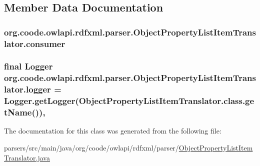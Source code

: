\subsection{Member Data Documentation}
\hypertarget{classorg_1_1coode_1_1owlapi_1_1rdfxml_1_1parser_1_1_object_property_list_item_translator_ab47844593c9a744bfc455132597d866f}{
\subsubsection[{consumer}]{ org.\-coode.\-owlapi.\-rdfxml.\-parser.\-Object\-Property\-List\-Item\-Translator.\-consumer\hspace{0.3cm}{\ttfamily [private]}}}\label{classorg_1_1coode_1_1owlapi_1_1rdfxml_1_1parser_1_1_object_property_list_item_translator_ab47844593c9a744bfc455132597d866f}
\hypertarget{classorg_1_1coode_1_1owlapi_1_1rdfxml_1_1parser_1_1_object_property_list_item_translator_a58753c7915b22ce635af64e3585b9f04}{
\subsubsection[{logger}]{\setlength{\rightskip}{0pt plus 5cm}final Logger org.\-coode.\-owlapi.\-rdfxml.\-parser.\-Object\-Property\-List\-Item\-Translator.\-logger = Logger.\-get\-Logger(Object\-Property\-List\-Item\-Translator.\-class.\-get\-Name())\hspace{0.3cm}{\ttfamily [static]}, {\ttfamily [private]}}}\label{classorg_1_1coode_1_1owlapi_1_1rdfxml_1_1parser_1_1_object_property_list_item_translator_a58753c7915b22ce635af64e3585b9f04}


The documentation for this class was generated from the following file\-:\begin{DoxyCompactItemize}
\item 
parsers/src/main/java/org/coode/owlapi/rdfxml/parser/\hyperlink{_object_property_list_item_translator_8java}{Object\-Property\-List\-Item\-Translator.\-java}\end{DoxyCompactItemize}
